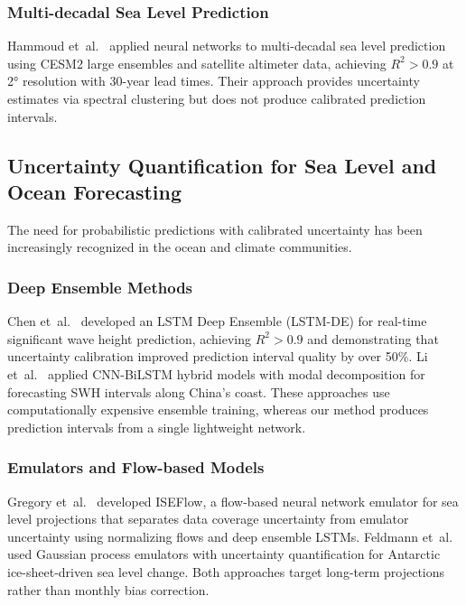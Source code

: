 \documentclass[conference]{IEEEtran}
\begin{document}
\subsubsection{Multi-decadal Sea Level Prediction}

Hammoud et~al.~\cite{hammoud2024} applied neural networks to multi-decadal sea level prediction using CESM2 large ensembles and satellite altimeter data, achieving $R^2 > 0.9$ at 2° resolution with 30-year lead times. Their approach provides uncertainty estimates via spectral clustering but does not produce calibrated prediction intervals.

\subsection{Uncertainty Quantification for Sea Level and Ocean Forecasting}

The need for probabilistic predictions with calibrated uncertainty has been increasingly recognized in the ocean and climate communities.

\subsubsection{Deep Ensemble Methods}

Chen et~al.~\cite{patel2024} developed an LSTM Deep Ensemble (LSTM-DE) for real-time significant wave height prediction, achieving $R^2 > 0.9$ and demonstrating that uncertainty calibration improved prediction interval quality by over 50\%. Li et~al.~\cite{li2025} applied CNN-BiLSTM hybrid models with modal decomposition for forecasting SWH intervals along China's coast. These approaches use computationally expensive ensemble training, whereas our method produces prediction intervals from a single lightweight network.

\subsubsection{Emulators and Flow-based Models}

Gregory et~al.~\cite{gregory2024} developed ISEFlow, a flow-based neural network emulator for sea level projections that separates data coverage uncertainty from emulator uncertainty using normalizing flows and deep ensemble LSTMs. Feldmann et~al.~\cite{feldmann2024} used Gaussian process emulators with uncertainty quantification for Antarctic ice-sheet-driven sea level change. Both approaches target long-term projections rather than monthly bias correction.
\end{document}
